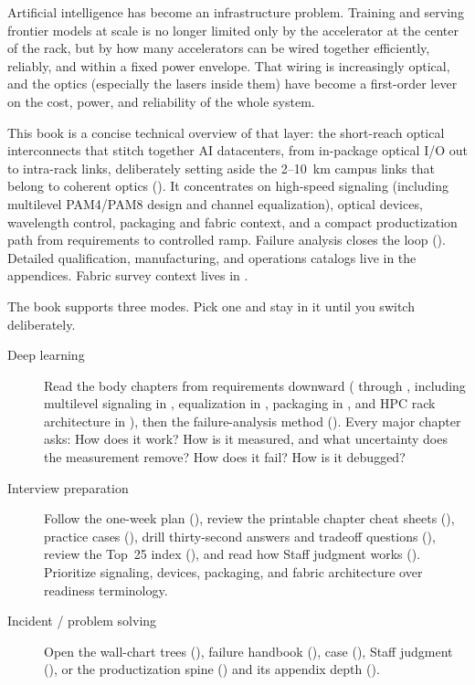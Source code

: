 Artificial intelligence has become an infrastructure problem. Training and
serving frontier models at scale is no longer limited only by the accelerator at
the center of the rack, but by how many accelerators can be wired together
efficiently, reliably, and within a fixed power envelope. That wiring is
increasingly optical, and the optics (especially the lasers inside them) have
become a first-order lever on the cost, power, and reliability of the whole
system.

This book is a concise technical overview of that layer: the short-reach optical
interconnects that stitch together AI datacenters, from in-package optical I/O
out to intra-rack links, deliberately setting aside the 2--10~km campus links that
belong to coherent optics (). It concentrates on high-speed
signaling (including multilevel PAM4/PAM8 design and channel equalization),
optical devices, wavelength control, packaging and fabric context, and a compact
productization path from requirements to controlled ramp. Failure analysis
closes the loop (). Detailed qualification, manufacturing,
and operations catalogs live in the appendices. Fabric survey context lives in
.

 The book supports three modes. Pick one
and stay in it until you switch deliberately.

\begin{description}
\item[Deep learning] Read the body chapters from requirements downward
      ( through , including multilevel
      signaling in , equalization in
      , packaging in , and HPC rack
      architecture in ), then the failure-analysis method
      (). Every major chapter asks: How does it work?
      How is it measured, and what uncertainty does the measurement remove?
      How does it fail? How is it debugged?
\item[Interview preparation] Follow the one-week plan
      (), review the printable chapter cheat sheets
      (), practice cases
      (), drill thirty-second answers and tradeoff
      questions (), review the Top~25 index
      (), and read how Staff judgment works
      (). Prioritize signaling, devices, packaging, and
      fabric architecture over readiness terminology.
\item[Incident / problem solving] Open the wall-chart trees
      (), failure handbook
      (), case (),
      Staff judgment (), or the productization spine
      () and its appendix depth
      ().
\end{description}


